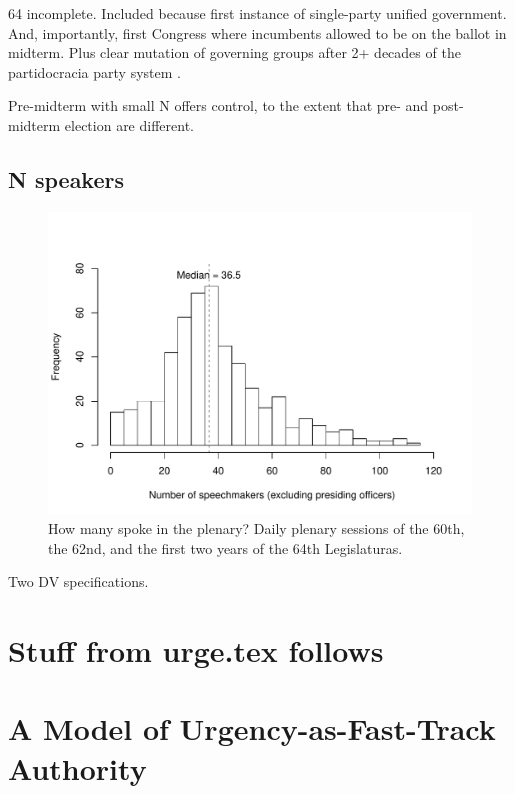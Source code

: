 \documentclass[letter,12pt]{article}
\begin{document}
64 incomplete. Included because first instance of single-party unified government. And, importantly, first Congress where incumbents allowed to be on the ballot in midterm. Plus clear mutation of governing groups after 2+ decades of the partidocracia party system \citep{magar.2007ref.2015,magar.estevez.rosas.2010}. 

Pre-midterm with small N offers control, to the extent that pre- and post-midterm election are different.



\subsection{N speakers}

\begin{figure}
  \centering
    \includegraphics[width=.8\columnwidth]{../plots/nspeakers.pdf}
    \caption{How many spoke in the plenary? Daily plenary sessions of the 60th, the 62nd, and the first two years of the 64th Legislaturas.}\label{F:nspeakers}
\end{figure}





Two DV specifications. 




\section{Stuff from urge.tex follows}

\section*{A Model of Urgency-as-Fast-Track Authority}
\end{document}
